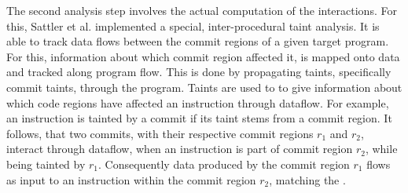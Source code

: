 The second analysis step involves the actual computation of the interactions.
For this, Sattler et al. implemented a special, inter-procedural taint analysis.
It is able to track data flows between the commit regions of a given target program.
For this, information about which commit region affected it, is mapped onto data and tracked along program flow.
This is done by propagating taints, specifically commit taints, through the program.
Taints are used to to give information about which code regions have affected an instruction through dataflow.
For example, an instruction is tainted by a commit if its taint stems from a commit region.
It follows, that two commits, with their respective commit regions $r_1$ and $r_2$, interact through dataflow, when an instruction is part of commit region $r_2$, while being tainted by $r_1$.
Consequently data produced by the commit region $r_1$ flows as input to an instruction within the commit region $r_2$, matching the \lowercase{}.
